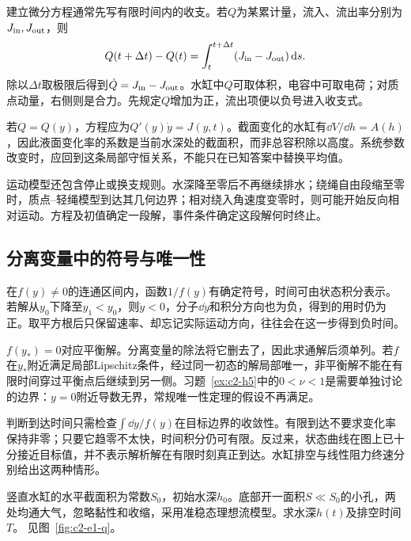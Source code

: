 建立微分方程通常先写有限时间内的收支。若$Q$为某累计量，流入、流出率分别为$J_{\rm in},J_{\rm out}$，则
\[Q(t+\Delta t)-Q(t)=\int_t^{t+\Delta t}(J_{\rm in}-J_{\rm out})\mathop{}\!\mathrm d s.\]
除以$\Delta t$取极限后得到$\dot Q=J_{\rm in}-J_{\rm out}$。水缸中$Q$可取体积，电容中可取电荷；对质点动量，右侧则是合力。先规定$Q$增加为正，流出项便以负号进入收支式。

若$Q=Q(y)$，方程应为$Q'(y)\dot y=J(y,t)$。截面变化的水缸有$\dd V/\dd h=A(h)$，因此液面变化率的系数是当前水深处的截面积，而非总容积除以高度。系统参数改变时，应回到这条局部守恒关系，不能只在已知答案中替换平均值。

运动模型还包含停止或换支规则。水深降至零后不再继续排水；绕绳自由段缩至零时，质点--轻绳模型到达其几何边界；相对绕入角速度变零时，则可能开始反向相对运动。方程及初值确定一段解，事件条件确定这段解何时终止。

\subsection{分离变量中的符号与唯一性}
在$f(y)\ne0$的连通区间内，函数$1/f(y)$有确定符号，时间可由状态积分表示。若解从$y_0$下降至$y_1<y_0$，则$\dot y<0$，分子$\dd y$和积分方向也为负，得到的用时仍为正。取平方根后只保留速率、却忘记实际运动方向，往往会在这一步得到负时间。

$f(y_*)=0$对应平衡解。分离变量的除法将它删去了，因此求通解后须单列。若$f$在$y_*$附近满足局部Lipschitz条件，经过同一初态的解局部唯一，非平衡解不能在有限时间穿过平衡点后继续到另一侧。习题~\ref{ex:c2-h5}中的$0<\nu<1$是需要单独讨论的边界：$y=0$附近导数无界，常规唯一性定理的假设不再满足。

判断到达时间只需检查$\int\dd y/f(y)$在目标边界的收敛性。有限到达不要求变化率保持非零；只要它趋零不太快，时间积分仍可有限。反过来，状态曲线在图上已十分接近目标值，并不表示解析解在有限时刻真正到达。水缸排空与线性阻力终速分别给出这两种情形。

\begin{example}[水缸泄水]\label{ex:c2-e1}
竖直水缸的水平截面积为常数$S_0$，初始水深$h_0$。底部开一面积$S\ll S_0$的小孔，两处均通大气，忽略黏性和收缩，采用准稳态理想流模型。求水深$h(t)$及排空时间$T$。 见图~\ref{fig:c2-e1-q}。
\end{example}

